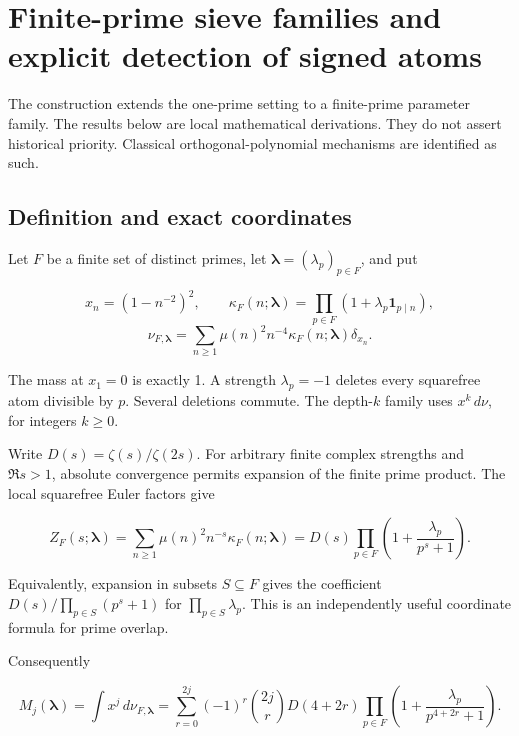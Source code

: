 \hypertarget{finite-prime-sieve-families-and-explicit-detection-of-signed-atoms}{%
\section{Finite-prime sieve families and explicit detection of signed
atoms}\label{finite-prime-sieve-families-and-explicit-detection-of-signed-atoms}}

The construction extends the one-prime setting to a finite-prime parameter family. The results below are local
mathematical derivations. They do not assert historical priority.
Classical orthogonal-polynomial mechanisms are identified as such.

\hypertarget{definition-and-exact-coordinates}{%
\subsection{Definition and exact
coordinates}\label{definition-and-exact-coordinates}}

Let \(F\) be a finite set of distinct primes, let
\(\boldsymbol\lambda=(\lambda_p)_{p\in F}\), and put

\[
x_n=(1-n^{-2})^2,\qquad
\kappa_F(n;\boldsymbol\lambda)=\prod_{p\in F}(1+\lambda_p\mathbf1_{p\mid n}),
\] \[
\nu_{F,\boldsymbol\lambda}
=\sum_{n\ge1}\mu(n)^2n^{-4}\kappa_F(n;\boldsymbol\lambda)\delta_{x_n}.
\]

The mass at \(x_1=0\) is exactly 1. A strength \(\lambda_p=-1\) deletes
every squarefree atom divisible by \(p\). Several deletions commute. The
depth-\(k\) family uses \(x^k\,d\nu\), for integers \(k\ge0\).

Write \(D(s)=\zeta(s)/\zeta(2s)\). For arbitrary finite complex
strengths and \(\Re s>1\), absolute convergence permits expansion of the
finite prime product. The local squarefree Euler factors give

\[
Z_F(s;\boldsymbol\lambda)
=\sum_{n\ge1}\mu(n)^2n^{-s}\kappa_F(n;\boldsymbol\lambda)
=D(s)\prod_{p\in F}\left(1+\frac{\lambda_p}{p^s+1}\right).
\]

Equivalently, expansion in subsets \(S\subseteq F\) gives the
coefficient \(D(s)/\prod_{p\in S}(p^s+1)\) for
\(\prod_{p\in S}\lambda_p\). This is an independently useful coordinate
formula for prime overlap.

Consequently

\[
M_j(\boldsymbol\lambda)=\int x^j\,d\nu_{F,\boldsymbol\lambda}
=\sum_{r=0}^{2j}(-1)^r\binom{2j}{r}
 D(4+2r)\prod_{p\in F}
 \left(1+\frac{\lambda_p}{p^{4+2r}+1}\right).
\tag{1}
\]

